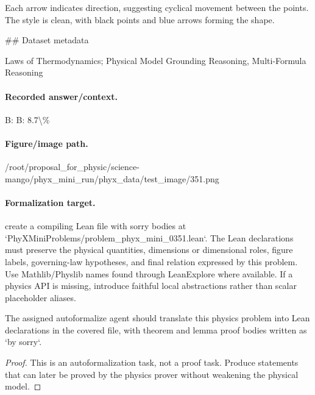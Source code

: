 Each arrow indicates direction, suggesting cyclical movement between the points. The style is clean, with black points and blue arrows forming the shape.

\#\# Dataset metadata

Laws of Thermodynamics; Physical Model Grounding Reasoning, Multi-Formula Reasoning

\paragraph{Recorded answer/context.}
B: B: 8.7\textbackslash{}\%

\paragraph{Figure/image path.}
/root/proposal\_for\_physic/science-mango/phyx\_mini\_run/phyx\_data/test\_image/351.png

\paragraph{Formalization target.}
create a compiling Lean file with sorry bodies at `PhyXMiniProblems/problem\_phyx\_mini\_0351.lean`. The Lean declarations must preserve the physical quantities, dimensions or dimensional roles, figure labels, governing-law hypotheses, and final relation expressed by this problem.
Use Mathlib/Physlib names found through LeanExplore where available. If a physics API is missing, introduce faithful local abstractions rather than scalar placeholder aliases.

\begin{theorem}
\label{thm:physics:phyx_mini_0351:target}
The assigned autoformalize agent should translate this physics problem into Lean declarations in the covered file, with theorem and lemma proof bodies written as `by sorry`.
\end{theorem}
\begin{proof}
This is an autoformalization task, not a proof task. Produce statements that can later be proved by the physics prover without weakening the physical model.
\end{proof}


